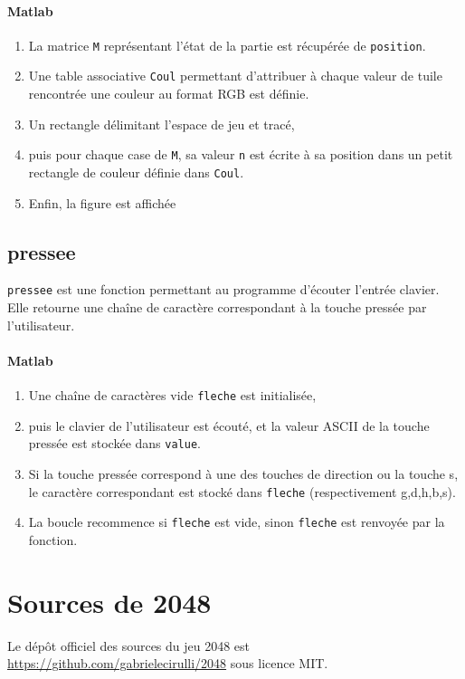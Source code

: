 \documentclass[a4paper]{report}
\begin{document}
\paragraph{Matlab}

\begin{enumerate}
\item La matrice \verb|M| représentant l'état de la partie est récupérée de \verb|position|.
\item Une table associative \verb|Coul| permettant d'attribuer à chaque valeur de tuile rencontrée une couleur au format RGB est définie.
\item Un rectangle délimitant l'espace de jeu et tracé,
\item puis pour chaque case de \verb|M|, sa valeur \verb|n| est écrite à sa position dans un petit rectangle de couleur définie dans \verb|Coul|.
\item Enfin, la figure est affichée
\end{enumerate}


\subsection{pressee}
\verb|pressee| est une fonction permettant au programme d'écouter l'entrée clavier. Elle retourne une chaîne de caractère correspondant à la touche pressée par l'utilisateur.

\paragraph{Matlab}

\begin{enumerate}
\item Une chaîne de caractères vide \verb|fleche| est initialisée,
\item puis le clavier de l'utilisateur est écouté, et la valeur ASCII de la touche pressée est stockée dans \verb|value|.
\item Si la touche pressée correspond à une des touches de direction ou la touche s, le caractère correspondant est stocké dans \verb|fleche| (respectivement g,d,h,b,s).
\item La boucle recommence si \verb|fleche| est vide, sinon \verb|fleche| est renvoyée par la fonction.
\end{enumerate}


\section{Sources de 2048}
Le dépôt officiel des sources du jeu 2048 est \url{https://github.com/gabrielecirulli/2048} sous licence MIT.
\end{document}
